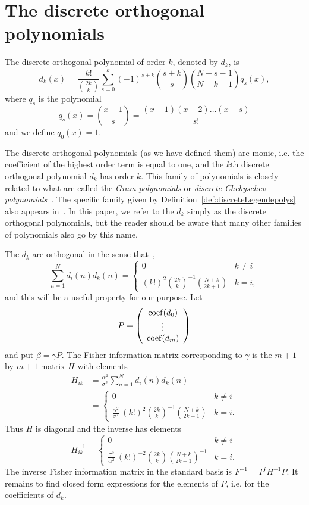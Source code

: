 \documentclass[journal,10pt]{IEEEtran}
\begin{document}
\section{The discrete orthogonal polynomials}\label{sec:discr-orth-polyn}

\begin{definition}  \label{def:discreteLegendepolys}
The discrete orthogonal polynomial of order $k$, denoted by $d_k$, is
\[
d_k(x) = \frac{k!}{\binom{2k}{k}}\sum_{s=0}^k{(-1)^{s+k}\binom{s+k}{s}\binom{N-s-1}{N-k-1}q_s(x)},
\]
where $q_s$ is the polynomial
\[
q_s(x) = \binom{x-1}{s} = \frac{(x-1)(x-2)\dots(x-s)}{s!}
\]
and we define $q_0(x) = 1$.
\end{definition}
The discrete orthogonal polynomials (as we have defined them) are monic, i.e. the coefficient of the highest order term is equal to one, and the $k$th discrete orthogonal polynomial $d_k$ has order $k$.  This family of polynomials is closely related to what are called the \emph{Gram polynomials} or \emph{discrete Chebyschev polynomials}~\cite[p. 323]{Bjork_num_methods_least_square_1996}.  The specific family given by Definition~\ref{def:discreteLegendepolys} also appears in~\cite{Eisinberg2007_discerete_otho_poly_equidist}.  In this paper, we refer to the $d_k$ simply as the discrete orthogonal polynomials, but the reader should be aware that many other families of polynomials also go by this name.  

The $d_k$ are orthogonal in the sense that~\cite{Eisinberg2007_discerete_otho_poly_equidist},
\[
\sum_{n=1}^{N}{ d_i(n) d_k(n) } = \begin{cases}
0 &  k\neq i \\
(k!)^2 \binom{2k}{k}^{-1} \binom{N+k}{2k+1}  & k = i,
\end{cases}
\]
and this will be a useful property for our purpose.  Let 
\[
P = \left( \begin{array}{c}
\operatorname{coef}(d_0) \\
\vdots \\
\operatorname{coef}(d_m)
\end{array} \right)
\]
and put $\beta = \gamma P$.  The Fisher information matrix corresponding to $\gamma$ is the $m+1$ by $m+1$ matrix $H$ with elements
\begin{align*}
H_{ik} &= \frac{\alpha^2}{\sigma^2}\sum_{n=1}^{N} d_{i}(n) d_{k}(n) \\
&= \begin{cases}
0 &  k\neq i \\
 \frac{\alpha^2}{\sigma^2}\ (k!)^2 \binom{2k}{k}^{-1} \binom{N+k}{2k+1}  & k = i.
\end{cases}
\end{align*}
Thus $H$ is diagonal and the inverse has elements
\[
H_{ik}^{-1} = \begin{cases}
0 &  k\neq i \\
 \frac{\sigma^2}{\alpha^2}\ (k!)^{-2} \binom{2k}{k} \binom{N+k}{2k+1}^{-1}  & k = i.
\end{cases}
\] 
The inverse Fisher information matrix in the standard basis is $F^{-1} = P^\prime H^{-1} P$.  It remains to find closed form expressions for the elements of $P$, i.e. for the coefficients of $d_k$.  
\end{document}

